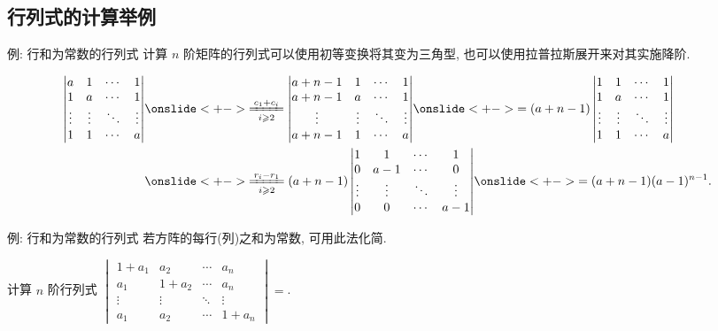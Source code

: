 \subsection{行列式的计算举例}


\begin{frame}{例: 行和为常数的行列式}
	\onslide<+->
	计算 $n$ 阶矩阵的行列式可以使用初等变换将其变为三角型, 也可以使用拉普拉斯展开来对其实施降阶.
	\onslide<+->
	\begin{example}
		\begin{align*}
			\begin{vmatrix}
				a&1&\cdots&1\\
				1&a&\cdots&1\\
				\vdots&\vdots&\ddots&\vdots\\
				1&1&\cdots&a
			\end{vmatrix}
		&\onslide<+->{\xeq[i\ge2]{c_1+c_i}\begin{vmatrix}
				a+n-1&1&\cdots&1\\
				a+n-1&a&\cdots&1\\
				\vdots&\vdots&\ddots&\vdots\\
				a+n-1&1&\cdots&a
			\end{vmatrix}}
		\onslide<+->{=(a+n-1)\begin{vmatrix}
				1&1&\cdots&1\\
				1&a&\cdots&1\\
				\vdots&\vdots&\ddots&\vdots\\
				1&1&\cdots&a
			\end{vmatrix}}\\
		&\onslide<+->{\xeq[i\ge2]{r_i-r_1}(a+n-1)\begin{vmatrix}
				1&1&\cdots&1\\
				0&a-1&\cdots&0\\
				\vdots&\vdots&\ddots&\vdots\\
				0&0&\cdots&a-1
			\end{vmatrix}}
		\onslide<+->{=(a+n-1)(a-1)^{n-1}.}
		\end{align*}
	\end{example}
\end{frame}


\begin{frame}{例: 行和为常数的行列式}
	\onslide<+->
	若方阵的每行(列)之和为常数, 可用此法化简.
	\onslide<+->
	\begin{exercise}
		计算 $n$ 阶行列式 $\begin{vmatrix}
			1+a_1&a_2&\cdots&a_n\\
			a_1&1+a_2&\cdots&a_n\\
			\vdots&\vdots&\ddots&\vdots\\
			a_1&a_2&\cdots&1+a_n
		\end{vmatrix}=$.
	\end{exercise}
\end{frame}


